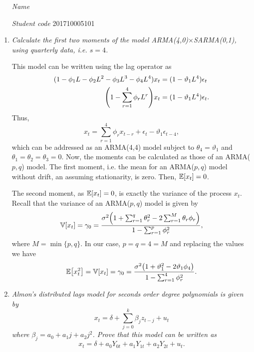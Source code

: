 \documentclass[fleqn]{article}
\newcommand{\E}[1]{\mathbb{E}\left[#1 \right]}
\newcommand{\V}[1]{\mathbb{V}\left[#1 \right]}
\let\originalleft\left
\let\originalright\right
\renewcommand{\left}{\mathopen{}\mathclose\bgroup\originalleft}
\renewcommand{\right}{\aftergroup\egroup\originalright}
\begin{document}
 \vspace{0.3cm}
   \begin{itemize}[leftmargin=6.25cm, labelsep=0.5cm]

     \item[\textit{Name}] \scalebox{1.2}{David Plazas Escudero} %
     \item[\textit{Student code}] 201710005101 %

   \end{itemize}
\vspace{0.3cm}

\begin{enumerate}
    \item \textit{Calculate the first two moments of the model ARMA(4,0)$\times$SARMA(0,1), using quarterly data, i.e. $s=4$.}
    
    This model can be written using the lag operator as 
    \[
    \begin{split}
         (1-\phi_1L-\phi_2L^2-\phi_3L^3-\phi_4L^4)x_t&=(1-\vartheta_1L^4)\epsilon_t\\
         \left(1-\sum_{r=1}^4\phi_rL^r\right)x_t&=(1-\vartheta_1L^4)\epsilon_t.
    \end{split}
    \]
    Thus,
    \[
    x_t=\sum_{r=1}^4\phi_rx_{t-r}+\epsilon_t-\vartheta_1\epsilon_{t-4},
    \]
    which can be addressed as an ARMA(4,4) model subject to $\theta_4=\vartheta_1$ and $\theta_1=\theta_2=\theta_3=0$. Now, the moments can be calculated as those of an ARMA($p,q$) model. The first moment, i.e. the mean for an ARMA($p,q$) model without drift, an assuming stationarity, is zero. Then, $\E{x_t}=0$.
    
    The second moment, as $\E{x_t}=0$, is exactly the variance of the process $x_t$. Recall that the variance of an ARMA($p,q$) model is given by
    \[
    \V{x_t}=\gamma_0=\dfrac{\sigma^2\left(1+\sum_{r=1}^q\theta_r^2-2\sum_{r=1}^M\theta_r\phi_r\right)}{1-\sum_{r=1}^p\phi_r^2},
    \]
    where $M=\min\{p,q\}$. In our case, $p=q=4=M$ and replacing the values we have
    \[
    \E{x_t^2}=\V{x_t}=\gamma_0=\dfrac{\sigma^2\left(1+\vartheta^2_1-2\vartheta_1\phi_4\right)}{1-\sum_{r=1}^4\phi_r^2}.
    \]
    
    \item \textit{Almon's distributed lags model for seconds order degree polynomials is given by
    \[
    x_t=\delta + \sum_{j=0}^k\beta_jz_{t-j} + u_t
    \]
    where $\beta_j=a_0+a_1j+a_2j^2$. Prove that this model can be written as} 
    \[
    x_t=\delta+a_0Y_{0t}+a_1Y_{1t}+a_2Y_{2t}+u_t.
    \]
    

\end{enumerate}
\end{document}
